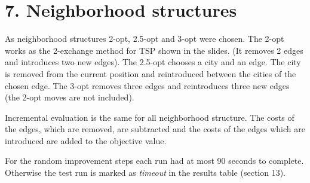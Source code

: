 \section*{7. Neighborhood structures}
As neighborhood structures 2-opt, 2.5-opt and 3-opt were chosen. The 2-opt works as the 2-exchange method for TSP shown in the slides. (It removes 2 edges and introduces two new edges). The 2.5-opt chooses a city and an edge. The city is removed from the current position and reintroduced between the cities of the chosen edge. The 3-opt removes three edges and reintroduces three new edges (the 2-opt moves are not included).

Incremental evaluation is the same for all neighborhood structure. The costs of the edges, which are removed, are subtracted and the costs of the edges which are introduced are added to the objective value.

For the random improvement steps each run had at most 90 seconds to complete. Otherwise the test run is marked as \textit{timeout} in the results table (section 13).


